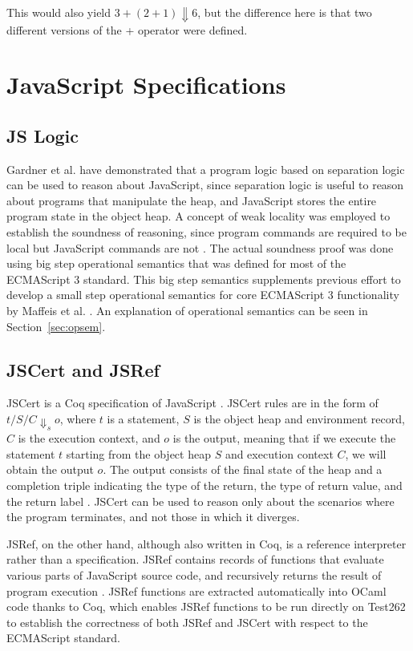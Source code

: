 \documentclass[a4paper,11pt,twoside]{report}
\begin{document}
This would also yield $3 + ( 2 + 1 ) \Downarrow 6$, but the difference here is that two different versions of the + operator were defined.

\section{JavaScript Specifications}

\subsection{JS Logic}\label{sec:jslogic}
Gardner et al. \cite{Gardner:2012} have demonstrated that a program logic based on separation logic can be used to reason about JavaScript, since separation logic is useful to reason about programs that manipulate the heap, and JavaScript stores the entire program state in the object heap. A concept of weak locality was employed to establish the soundness of reasoning, since program commands are required to be local but JavaScript commands are not \cite{Gardner:2012}. The actual soundness proof was done using big step operational semantics that was defined for most of the ECMAScript 3 standard. This big step  semantics supplements previous effort to develop a small step operational semantics for core ECMAScript 3 functionality by Maffeis et al. \cite{Maffeis:2008}. An explanation of operational semantics can be seen in Section~\ref{sec:opsem}.

\subsection{JSCert and JSRef}\label{sec:jscert}
JSCert is a Coq specification of JavaScript \cite{Bodin:2014}. JSCert rules are in the form of $t/S/C \Downarrow_s o$, where $t$ is a statement, $S$ is the object heap and environment record, $C$ is the execution context, and $o$ is the output, meaning that if we execute the statement $t$ starting from the object heap $S$ and execution context $C$, we will obtain the output $o$. The output consists of the final state of the heap and a completion triple indicating the type of the return, the type of return value, and the return label \cite{Bodin:2014}. JSCert can be used to reason only about the scenarios where the program terminates, and not those in which it diverges.

JSRef, on the other hand, although also written in Coq, is a reference interpreter rather than a specification. JSRef contains records of functions that evaluate various parts of JavaScript source code, and recursively returns the result of program execution \cite{Bodin:2014}. JSRef functions are extracted automatically into OCaml code thanks to Coq, which enables JSRef functions to be run directly on Test262 to establish the correctness of both JSRef and JSCert with respect to the ECMAScript standard.
\end{document}
